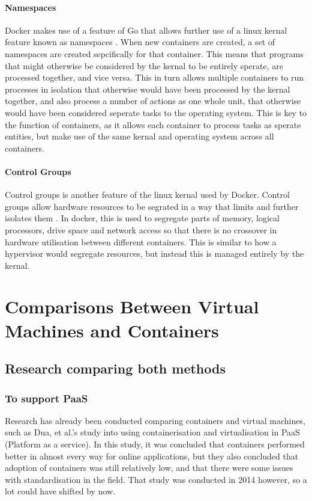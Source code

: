 \subsubsection{Namespaces}
Docker makes use of a feature of Go that allows further use of a linux kernal feature known as namespaces \citep[Section: Namespaces]{DockerOverview}.
When new containers are created, a set of namespaces are created sepcifically for that container. This means that programs that might otherwise be considered by the kernal to be entirely sperate, are processed together, and vice versa. This in turn allows multiple containers to run processes in isolation that otherwise would have been processed by the kernal together, and also process a number of actions as one whole unit, that otherwise would have been considered seperate tasks to the operating system. This is key to the function of containers, as it allows each container to process tasks as sperate entities, but make use of the same kernal and operating system across all containers.

\subsubsection{Control Groups}
Control groups is another feature of the linux kernal used by Docker. Control groups allow hardware resources to be segrated in a way that limits and further isolates them \citep{corbetControlGroups}. In docker, this is used to segregate parts of memory, logical processors, drive space and network access so that there is no crossover in hardware utilisation between different containers. This is similar to how a hypervisor would segregate resources, but instead this is managed entirely by the kernal.

\chapter{Comparisons Between Virtual Machines and Containers}
\section{Research comparing both methods}
\label{ComparisonStudies}
\subsection{To support PaaS}
Research has already been conducted comparing containers and virtual machines, such as Dua, et al.'s study into using containerisation and virtualisation in PaaS (Platform as a service)\citep{dua14}. In this study, it was concluded that containers performed better in almost every way for online applications, but they also concluded that adoption of containers was still relatively low, and that there were some issues with standardisation in the field\citep{dua14}. That study was conducted in 2014 however, so a lot could have shifted by now. 


